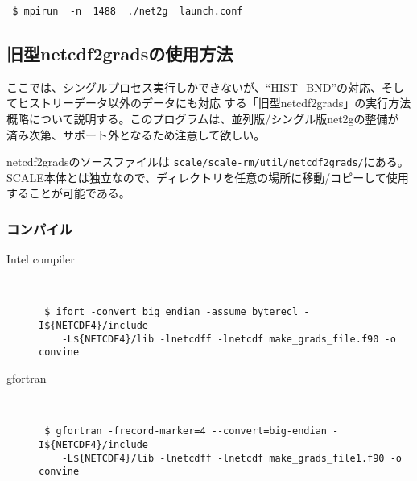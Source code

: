 \begin{verbatim}
 $ mpirun  -n  1488  ./net2g  launch.conf
\end{verbatim}



\subsection{旧型netcdf2gradsの使用方法}
ここでは、シングルプロセス実行しかできないが、``HIST\_BND''の対応、そしてヒストリーデータ以外のデータにも対応
する「旧型netcdf2grads」の実行方法概略について説明する。このプログラムは、並列版/シングル版net2gの整備が
済み次第、サポート外となるため注意して欲しい。

netcdf2gradsのソースファイルは \verb|scale/scale-rm/util/netcdf2grads/|にある。
SCALE本体とは独立なので、ディレクトリを任意の場所に移動/コピーして使用することが可能である。

\subsubsection{コンパイル}
\begin{description}
\item[Intel compiler]\mbox{}\\
 \begin{verbatim}
 $ ifort -convert big_endian -assume byterecl -I${NETCDF4}/include 
    -L${NETCDF4}/lib -lnetcdff -lnetcdf make_grads_file.f90 -o convine
  \end{verbatim}
\item[gfortran]\mbox{}\\
\begin{verbatim}
 $ gfortran -frecord-marker=4 --convert=big-endian -I${NETCDF4}/include
    -L${NETCDF4}/lib -lnetcdff -lnetcdf make_grads_file1.f90 -o convine
\end{verbatim}
\end{description}


